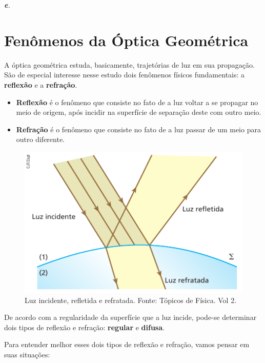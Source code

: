 \documentclass[11pt,twocolumn,oneside]{article}
\newenvironment{resposta*}
  {\bf Resposta:\\ }
  {}
\begin{document}
\begin{resposta*}
{\it \textbf{e}.}
\end{resposta*}

\hypertarget{x-fenômenos-da-óptica-geométrica}{\section{Fenômenos da Óptica Geométrica}}
A óptica geométrica estuda, basicamente, trajetórias de luz em sua propagação. São de especial interesse nesse estudo dois fenômenos físicos fundamentais: a \textbf{reflexão} e a \textbf{refração}.


\begin{itemize}

\item \textbf{Reflexão} é o fenômeno que consiste no fato de a luz voltar a se propagar no meio de origem, após incidir na superfície de separação deste com outro meio.

\item \textbf{Refração} é o fenômeno que consiste no fato de a luz passar de um meio para outro diferente.

\end{itemize}


\begin{figure}[h]{}
\centering\includegraphics[width=2.5truein]{img7.png}
\caption{Luz incidente, refletida e refratada. Fonte: Tópicos de Física. Vol 2.}
\centering
\end{figure}

De acordo com a regularidade da superfície que a luz incide, pode-se determinar dois tipos de reflexão e refração: \textbf{regular} e \textbf{difusa}.


Para entender melhor esses dois tipos de reflexão e refração, vamos pensar em suas situações:
\end{document}
